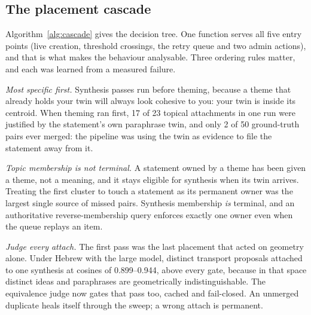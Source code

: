\documentclass{article}
\begin{document}
\subsection{The placement cascade}
\label{sec:cascade}
Algorithm~\ref{alg:cascade} gives the decision tree. One function serves all five entry points (live creation, threshold crossings, the retry queue and two admin actions), and that is what makes the behaviour analysable. Three ordering rules matter, and each was learned from a measured failure.

\emph{Most specific first.} Synthesis passes run before theming, because a theme that already holds your twin will always look cohesive to you: your twin is inside its centroid. When theming ran first, 17 of 23 topical attachments in one run were justified by the statement's own paraphrase twin, and only 2 of 50 ground-truth pairs ever merged: the pipeline was using the twin as evidence to file the statement away from it.

\emph{Topic membership is not terminal.} A statement owned by a theme has been given a theme, not a meaning, and it stays eligible for synthesis when its twin arrives. Treating the first cluster to touch a statement as its permanent owner was the largest single source of missed pairs. Synthesis membership \emph{is} terminal, and an authoritative reverse-membership query enforces exactly one owner even when the queue replays an item.

\emph{Judge every attach.} The first pass was the last placement that acted on geometry alone. Under Hebrew with the large model, distinct transport proposals attached to one synthesis at cosines of 0.899--0.944, above every gate, because in that space distinct ideas and paraphrases are geometrically indistinguishable. The equivalence judge now gates that pass too, cached and fail-closed. An unmerged duplicate heals itself through the sweep; a wrong attach is permanent.
\end{document}
